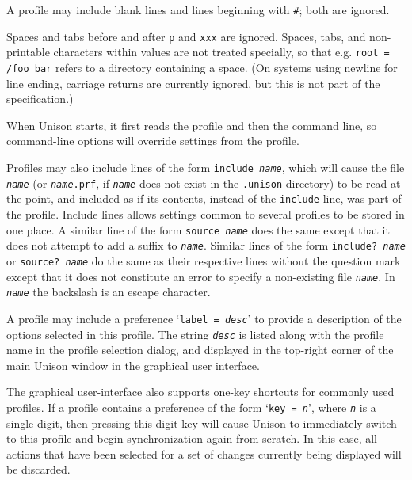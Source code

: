 \documentclass{article}
\newcommand{\ARG}[1]{\texttt{\textit{#1}}}
\begin{document}
A profile may include blank lines and lines beginning
with {\tt \#}; both are ignored.

Spaces and tabs before and after {\tt p} and {\tt xxx} are ignored.
Spaces, tabs, and non-printable characters within values are not
treated specially, so that e.g. \verb|root = /foo bar| refers to a
directory containing a space.
(On systems using newline for line ending, carriage returns are
currently ignored, but this is not part of the specification.)

When Unison starts, it first reads the profile and then the command
line, so command-line options will override settings from the
profile.

Profiles may also include lines of the form \texttt{include \ARG{name}},
which will cause the file \ARG{name} (or \texttt{\ARG{name}.prf}, if
\ARG{name} does not exist in the \verb+.unison+ directory) to be read at
the point, and included as if its contents, instead of the \texttt{include}
line, was part of the profile.  Include lines allows settings common to
several profiles to be stored in one place.
A similar line of the form \texttt{source \ARG{name}} does the same except
that it does not attempt to add a suffix to \ARG{name}.
Similar lines of the form \texttt{include\mbox{?} \ARG{name}} or
\texttt{source\mbox{?} \ARG{name}} do the same as their respective lines
without the question mark except that it does not constitute an error to
specify a non-existing file \ARG{name}.
In \ARG{name} the backslash is an escape character.

A profile may include a preference `\texttt{label = \ARG{desc}}' to
provide a description of the options selected in this profile.  The
string \ARG{desc} is listed along with the profile name in the profile
selection dialog, and displayed in the top-right corner of the main
Unison window in the graphical user interface.

The graphical user-interface also supports one-key shortcuts for commonly
used profiles.  If a profile contains a preference of the form
%
`\texttt{key = \ARG{n}}', where \ARG{n} is a single digit, then
pressing this digit key will cause Unison to immediately switch to
this profile and begin synchronization again from scratch.  In this
case, all actions that have been selected for a set of changes
currently being displayed will be discarded.



\end{document}
